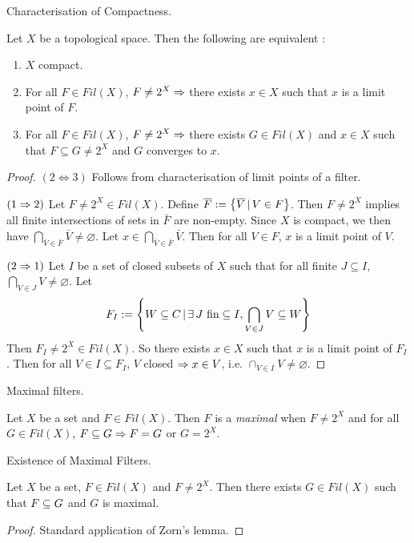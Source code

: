 \documentclass[main.tex]{subfiles}
\begin{document}
\begin{thm} Characterisation of Compactness. 
  
  Let $X$ be a topological space. 
  Then the following are equivalent : 
  \begin{enumerate}
    \item $X$ compact. 
    \item For all $F \in Fil(X)$,
    $F \neq 2^X \Rightarrow$
    there exists $x \in X$ such that $x$ is a limit point of $F$.
    \item For all $F \in Fil(X)$,
    $F \neq 2^X \Rightarrow$
    there exists $G \in Fil(X)$ and $x \in X$
    such that $F \subseteq G \neq 2^X$ and $G$ converges to $x$.
  \end{enumerate}
\end{thm}
\begin{proof}
  $(2 \iff 3)$ Follows from characterisation of limit points of a filter.

  $(1\Rightarrow 2)$ 
  Let $F \neq 2^X \in Fil(X)$.
  Define $\overline{F} := \left\{\overline{V}\,|\, V \in F\right\}$.
  Then $F \neq 2^X$ implies 
  all finite intersections of sets in $\bar{F}$ are non-empty. 
  Since $X$ is compact, 
  we then have $\bigcap_{\bar{V} \in \bar{F}} \bar{V} \neq \varnothing$.
  Let $x \in \bigcap_{\bar{V} \in \bar{F}} \bar{V}$.
  Then for all $V \in F$, $x$ is a limit point of $V$.

  $(2\Rightarrow 1)$ Let $I$ be a set of closed subsets of $X$
  such that for all finite $J \subseteq I$, 
  $\bigcap_{V \in J} V \neq \varnothing$.
  Let \[
    F_I := \left\{
      W \subseteq C \,|\, \exists\, J\text{ fin} \subseteq I, 
      \bigcap_{V \in J} V \subseteq W
    \right\}
  \]
  Then $F_I \neq 2^X \in Fil(X)$.
  So there exists $x \in X$
  such that $x$ is a limit point of $F_I$.
  Then for all $V \in I \subseteq F_I$, 
  $V$ closed $\Rightarrow x \in V$,
  i.e. $\cap_{V \in I} V \neq \varnothing$.
\end{proof}

\begin{dfn} Maximal filters. 
  
  Let $X$ be a set and $F \in Fil(X)$.
  Then $F$ is a \emph{maximal} when 
  $F \neq 2^X$ and for all $G \in Fil(X)$, 
  $F \subseteq G \Rightarrow F = G$ or $G = 2^X$. 
\end{dfn}

\begin{lem} Existence of Maximal Filters.
  
  Let $X$ be a set, $F \in Fil(X)$ and $F \neq 2^X$.
  Then there exists $G \in Fil(X)$ such that 
  $F \subseteq G$ and $G$ is maximal.
\end{lem}
\begin{proof}
  Standard application of Zorn's lemma.
\end{proof}
\end{document}
